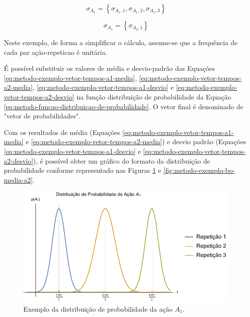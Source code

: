 \begin{equation}
    \sigma_{A_1} = \left\{
		\sigma_{{A_1},1}, 
		\sigma_{{A_1},2}, 	
		\sigma_{{A_1},3}
	\right\}
	\label{eq:metodo-exemplo-vetor-tempos-a1-desvio}
\end{equation}

\begin{equation}
    \sigma_{A_1} = \left\{
		\sigma_{{A_2},1}
	\right\}
	\label{eq:metodo-exemplo-vetor-tempos-a2-desvio}
\end{equation}

Neste exemplo, de forma a simplificar o cálculo, assume-se que a frequência de cada par ação-\gls{repeticao} é unitária.

É possível substituir os valores de média e desvio-padrão das Equações \ref{eq:metodo-exemplo-vetor-tempos-a1-media}, \ref{eq:metodo-exemplo-vetor-tempos-a2-media}, \ref{eq:metodo-exemplo-vetor-tempos-a1-desvio} e \ref{eq:metodo-exemplo-vetor-tempos-a2-desvio} na função distribuição de probabilidade da Equação \ref{eq:metodo-funcao-distribuicao-de-probabilidade}. O vetor final é denominado de "vetor de probabilidades".

Com os resultados de média (Equações \ref{eq:metodo-exemplo-vetor-tempos-a1-media} e \ref{eq:metodo-exemplo-vetor-tempos-a2-media}) e desvio padrão (Equações \ref{eq:metodo-exemplo-vetor-tempos-a1-desvio} e \ref{eq:metodo-exemplo-vetor-tempos-a2-desvio}), é possível obter um gráfico do formato da distribuição de probabilidade conforme representado nas Figuras \ref{fig:metodo-exemplo-bo-media-a1} e \ref{fig:metodo-exemplo-bo-media-a2}.

\begin{figure}[htb]
	\caption{\label{fig:metodo-exemplo-bo-media-a1} Exemplo da distribuição de probabilidade da ação $A_1$.}
	\begin{center}
	    \includegraphics[width=\linewidth]{../Mathematica/Images/Exemplo_BO_Media_A1.pdf}
	\end{center}
\end{figure}

